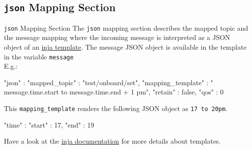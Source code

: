 ﻿\subsection{\texttt{json} Mapping Section}

\begin{frame}[fragile]{\texttt{json} Mapping Section}
  The \textcolor{fh-ooe-red}{\texttt{json}} mapping section describes the \textcolor{fh-ooe-red}{mapped topic} and the \textcolor{fh-ooe-red}{message mapping} where the \textcolor{fh-ooe-red}{incoming message} is \textcolor{fh-ooe-red}{interpreted as a JSON object} of an \textcolor{fh-ooe-red}{\href{https://github.com/pantor/inja/tree/master}{inja template}}. The message \textcolor{fh-ooe-red}{JSON object} is available in the template in the variable \texttt{\textcolor{fh-ooe-red}{message}}\\E.g.:

  \begin{jsoncode}[gobble=4]
    {
        "json" : {
            "mapped_topic" : "test/onboard/set",
            "mapping_template" : "{{ message.time.start }} to {{ message.time.end + 1 }}pm",
            "retain" : false,
            "qos" : 0
        }
    }
  \end{jsoncode}
  This \texttt{\textcolor{fh-ooe-red}{mapping\_template}} renders the following JSON object as \texttt{\textcolor{fh-ooe-red}{17 to 20pm}}.

  \begin{jsoncode}[gobble=4]
    {
        "time" : {
            "start" : 17,
            "end" : 19
        }
    }
  \end{jsoncode}
  Have a look at the \textcolor{fh-ooe-red}{\href{https://github.com/pantor/inja/tree/master}{inja documentation}} for more details about templates.
\end{frame}

